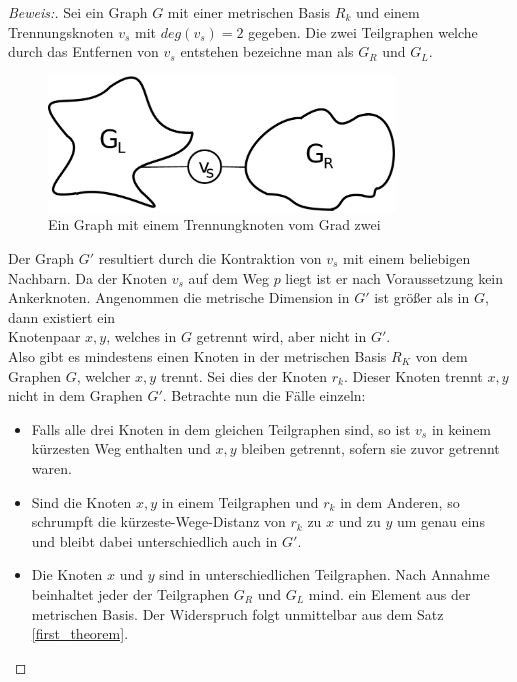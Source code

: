 \begin{proof}[Beweis:]
Sei ein Graph $G$ mit einer metrischen Basis $R_k$ und einem Trennungsknoten $v_s$ mit $deg(v_s)=2$ gegeben. Die zwei Teilgraphen welche durch das Entfernen von $v_s$ entstehen bezeichne man als $G_R$ und $G_L$.
\begin{figure}[ht]
\centering
\includegraphics*[width = 260pt]{bilder/proof4,2.pdf}
\caption{Ein Graph mit einem Trennungknoten vom Grad zwei}
\end{figure}
\newline Der Graph $G'$ resultiert durch die Kontraktion von $v_s$ mit einem beliebigen Nachbarn. Da der Knoten $v_s$ auf dem Weg $p$ liegt ist er nach Voraussetzung kein Ankerknoten.\newline
Angenommen die metrische Dimension in $G'$ ist größer als in $G$, dann existiert ein\\Knotenpaar $x,y$, welches in $G$ getrennt wird, aber nicht in $G'$.\\Also gibt es mindestens einen Knoten in der metrischen Basis $R_K$ von dem Graphen $G$, welcher $x,y$ trennt. Sei dies der Knoten $r_k$. Dieser Knoten trennt $x,y$ nicht in dem Graphen $G'$. 
Betrachte nun die Fälle einzeln:
\begin{itemize}
\item Falls alle drei Knoten in dem gleichen Teilgraphen sind, so ist $v_s$ in keinem kürzesten Weg enthalten und $x,y$ bleiben getrennt, sofern sie zuvor getrennt waren.
\item Sind die Knoten $x,y$ in einem Teilgraphen und $r_k$ in dem Anderen, so schrumpft die kürzeste-Wege-Distanz von $r_k$ zu $x$ und zu $y$ um genau eins und bleibt dabei unterschiedlich auch in $G'$.
\item Die Knoten $x$ und $y$ sind in unterschiedlichen Teilgraphen. Nach Annahme beinhaltet jeder der Teilgraphen $G_R$ und $G_L$ mind. ein Element aus der metrischen Basis. Der Widerspruch folgt unmittelbar aus dem Satz \ref{first_theorem}.
\end{itemize}
\end{proof}
